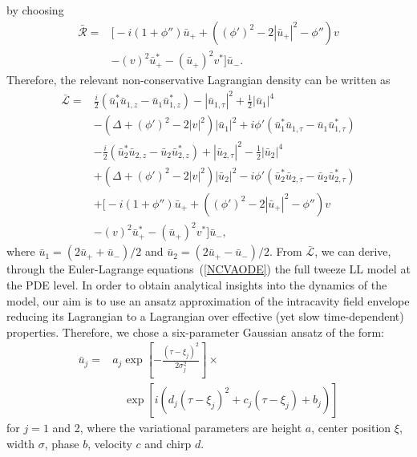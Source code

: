 \documentclass[aps,floatfix,showpacs,preprintnumbers,twocolumn,nofootinbib]{revtex4}
\begin{document}
by choosing 
\begin{align}
\bar{\mathcal{R}} =& \Big[ - i (1+\phi'') \bar{u}_+ + \left((\phi')^2  - 2 |\bar{u}_+|^2- \phi''\right) v  \nonumber \\
& - (v)^2 \bar{u}_+^* - (\bar{u}_+)^2 v^* \Big]  \bar{u}_-.
\end{align}
Therefore, the relevant non-conservative Lagrangian density can be written as 
\begin{align}
\bar{\mathcal{L}} =&  \frac{i}{2} \left(\bar{u}_1^* \bar{u}_{1,z} - \bar{u}_1\bar{u}_{1,z}^* \right) - |\bar{u}_{1,\tau}|^2 + \frac{1}{2} |\bar{u}_1|^4 \nonumber \\
&-\left( \Delta +  (\phi')^2 -2|v|^2 \right) |\bar{u}_1|^2 + i\phi' \left(\bar{u}_1^* \bar{u}_{1,\tau} - \bar{u}_1\bar{u}_{1,\tau}^*  \right) \nonumber \\
& - \frac{i}{2} \left(\bar{u}_2^* \bar{u}_{2,z} - \bar{u}_2\bar{u}_{2,z}^* \right) + |\bar{u}_{2,\tau}|^2 - \frac{1}{2} |\bar{u}_2|^4 \nonumber \\
&+ \left( \Delta +  (\phi')^2 -2|v|^2 \right) |\bar{u}_2|^2 - i\phi' \left(\bar{u}_2^* \bar{u}_{2,\tau} - \bar{u}_2\bar{u}_{2,\tau}^*  \right) \nonumber \\
& + \Big[ - i (1+\phi'') \bar{u}_+ + \left((\phi')^2  - 2 |\bar{u}_+|^2- \phi''\right) v \nonumber \\
&-  (v)^2 \bar{u}_+^* - (\bar{u}_+)^2 v^* \Big]  \bar{u}_-,
\end{align}
where $\bar{u}_1 = (2\bar{u}_+ + \bar{u}_-)/2$ and $\bar{u}_2 = (2\bar{u}_+ - \bar{u}_-)/2$.  
From $\bar{\mathcal{L}}$, we can derive, through the Euler-Lagrange equations~(\ref{NCVAODE}) the full tweeze LL model at the PDE level.  In order to obtain analytical insights into the dynamics of the model, our aim is to use an ansatz approximation of the intracavity field envelope reducing its Lagrangian to a Lagrangian over effective (yet slow time-dependent) properties.  Therefore, we chose a six-parameter Gaussian ansatz of the form:
\begin{align}
\bar{u}_j =& a_j \exp \left[ -\frac{(\tau - \xi_j)^2}{2\sigma_j^2} \right] \times \nonumber \\
& \quad \exp \left[ i (d_j (\tau - \xi_j)^2 + c_j (\tau - \xi_j) + b_j ) \right]
\label{6pAnsatzTweeze}
\end{align}
for $j=1$ and 2, where the variational parameters are height $a$, center position $\xi$, width $\sigma$, phase $b$, velocity $c$ and chirp $d$.  
\end{document}
